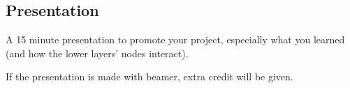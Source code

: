\documentclass[11pt]{article}
\begin{document}
\subsection{Presentation}
A 15 minute presentation to promote your project, especially what you learned (and how the lower layers' nodes interact).

If the presentation is made with beamer, extra credit will be given.
\end{document}
